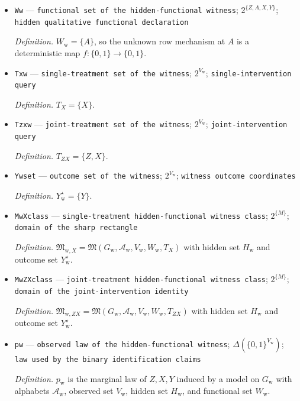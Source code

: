 \documentclass{article}
\begin{document}
\begin{itemize}
  \item \texttt{Ww} --- \texttt{functional set of the hidden-\allowbreak{}functional witness}; \(2^{\{Z,A,X,Y\}}\); \texttt{hidden qualitative functional declaration}
  \par\smallskip\noindent\emph{Definition.} \(W_{\mathrm w}=\{A\}\), so the unknown row mechanism at \(A\) is a deterministic map \(f:\{0,1\}\to\{0,1\}\).
  \item \texttt{Txw} --- \texttt{single-\allowbreak{}treatment set of the witness}; \(2^{V_{\mathrm w}}\); \texttt{single-\allowbreak{}intervention query}
  \par\smallskip\noindent\emph{Definition.} \(T_{X}=\{X\}\).
  \item \texttt{Tzxw} --- \texttt{joint-\allowbreak{}treatment set of the witness}; \(2^{V_{\mathrm w}}\); \texttt{joint-\allowbreak{}intervention query}
  \par\smallskip\noindent\emph{Definition.} \(T_{ZX}=\{Z,X\}\).
  \item \texttt{Ywset} --- \texttt{outcome set of the witness}; \(2^{V_{\mathrm w}}\); \texttt{witness outcome coordinates}
  \par\smallskip\noindent\emph{Definition.} \(Y_{\mathrm w}^{\star}=\{Y\}\).
  \item \texttt{MwXclass} --- \texttt{single-\allowbreak{}treatment hidden-\allowbreak{}functional witness class}; \(2^{\{M\}}\); \texttt{domain of the sharp rectangle}
  \par\smallskip\noindent\emph{Definition.} \(\mathfrak M_{\mathrm w,X}=\mathfrak M(G_{\mathrm w},\mathcal A_{\mathrm w},V_{\mathrm w},W_{\mathrm w},T_X)\) with hidden set \(H_{\mathrm w}\) and outcome set \(Y_{\mathrm w}^{\star}\).
  \item \texttt{MwZXclass} --- \texttt{joint-\allowbreak{}treatment hidden-\allowbreak{}functional witness class}; \(2^{\{M\}}\); \texttt{domain of the joint-\allowbreak{}intervention identity}
  \par\smallskip\noindent\emph{Definition.} \(\mathfrak M_{\mathrm w,ZX}=\mathfrak M(G_{\mathrm w},\mathcal A_{\mathrm w},V_{\mathrm w},W_{\mathrm w},T_{ZX})\) with hidden set \(H_{\mathrm w}\) and outcome set \(Y_{\mathrm w}^{\star}\).
  \item \texttt{pw} --- \texttt{observed law of the hidden-\allowbreak{}functional witness}; \(\Delta(\{0,1\}^{V_{\mathrm w}})\); \texttt{law used by the binary identification claims}
  \par\smallskip\noindent\emph{Definition.} \(p_{\mathrm w}\) is the marginal law of \(Z,X,Y\) induced by a model on \(G_{\mathrm w}\) with alphabets \(\mathcal A_{\mathrm w}\), observed set \(V_{\mathrm w}\), hidden set \(H_{\mathrm w}\), and functional set \(W_{\mathrm w}\).

\end{itemize}
\end{document}
